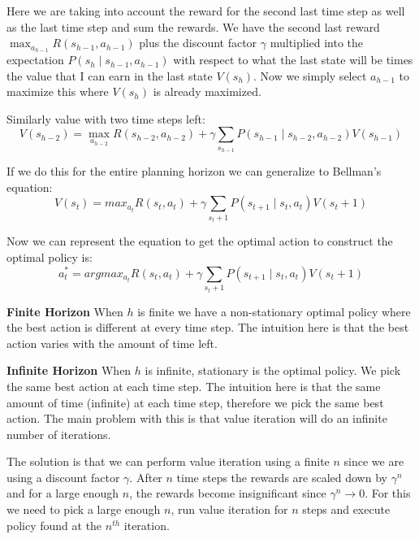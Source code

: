 \documentclass[12pt]{article}
\begin{document}
            Here we are taking into account the reward for the second last time step as well as the last time step and
            sum the rewards. We have the second last reward $\max _{a_{h-1}} R\left(s_{h-1}, a_{h-1}\right)$ plus the
            discount factor $\gamma$ multiplied into the expectation $P(s_{h} \mid s_{h-1}, a_{h-1})$ with respect to
            what the last state will be times the value that I can earn in the last state $V(s_h)$. Now we simply select
            $a_{h-1}$ to maximize this where $V(s_h)$ is already maximized.

            Similarly value with two time steps left:
            $$ V\left(s_{h-2}\right)=\max _{a_{h-2}} R\left(s_{h-2}, a_{h-2}\right)+\gamma \sum_{s_{h-1}} P(s_{h-1} \mid
            s_{h-2}, a_{h-2}) V\left(s_{h-1}\right) $$

            If we do this for the entire planning horizon we can generalize to Bellman's equation:
            $$ V(s_t) = max_{a_t} R(s_t, a_t) + \gamma \sum_{s_t + 1} P(s_{t+1} \mid s_t, a_t) V(s_t + 1) $$

            Now we can represent the equation to get the optimal action to construct the optimal policy is:
            $$ a_t^* = argmax_{a_t} R(s_t, a_t) + \gamma \sum_{s_t + 1} P(s_{t+1} \mid s_t, a_t) V(s_t + 1) $$

            \textbf{Finite Horizon}
                When $h$ is finite we have a non-stationary optimal policy where the best action is different at every
                time step. The intuition here is that the best action varies with the amount of time left.

            \textbf{Infinite Horizon}
                When $h$ is infinite, stationary is the optimal policy. We pick the same best action at each time step.
                The intuition here is that the same amount of time (infinite) at each time step, therefore we pick the
                same best action. The main problem with this is that value iteration will do an infinite number of
                iterations. 

                The solution is that we can perform value iteration using a finite $n$ since we are using a discount
                factor $\gamma$. After $n$ time steps the rewards are scaled down by $\gamma^n$ and for a large enough
                $n$, the rewards become insignificant since $\gamma^n \rightarrow 0$. For this we need to pick a large
                enough $n$, run value iteration for $n$ steps and execute policy found at the $n^{th}$ iteration.
            
\printindex
\end{document}
